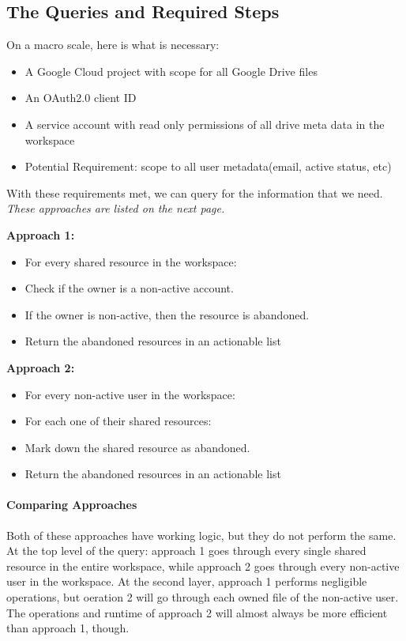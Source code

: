 \documentclass{article}
\begin{document}
\subsection*{The Queries and Required Steps}
On a macro scale, here is what is necessary:
\begin{tcolorbox}
    \begin{itemize}
        \item A Google Cloud project with scope for all Google Drive files
        \item An OAuth2.0 client ID
        \item A service account with read only permissions of all drive meta data in the workspace
        \item Potential Requirement: scope to all user metadata(email, active status, etc)
    \end{itemize}
\end{tcolorbox}
With these requirements met, we can query for the information that we need.
\textit{These approaches are listed on the next page.}
\newpage
\begin{tcolorbox}
    \textbf{Approach 1:}
    \begin{itemize}
        \item For every shared resource in the workspace:
        \item Check if the owner is a non-active account.
        \item If the owner is non-active, then the resource is abandoned.
        \item Return the abandoned resources in an actionable list
    \end{itemize}
\end{tcolorbox}
\begin{tcolorbox}
    \textbf{Approach 2:}
    \begin{itemize}
        \item For every non-active user in the workspace:
        \item For each one of their shared resources:
        \item Mark down the shared resource as abandoned.
        \item Return the abandoned resources in an actionable list
    \end{itemize}
\end{tcolorbox}

\paragraph*{Comparing Approaches} Both of these approaches have working logic,
but they do not perform the same.
At the top level of the query: approach 1 goes through every single shared resource in the entire workspace,
while approach 2 goes through every non-active user in the workspace. At the second layer, approach 1 performs negligible operations, but oeration 2 will go through each owned file of the non-active user.
The operations and runtime of approach 2 will almost always be more efficient than approach 1, though.
\end{document}
